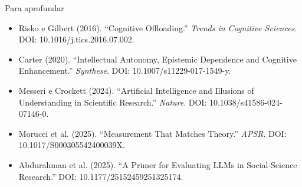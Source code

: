 \documentclass[
  12pt,
  ignorenonframetext,
  aspectratio=169]{beamer}
\begin{document}
\begin{frame}{Para aprofundar}
\protect{}\label{para-aprofundar}
\small

\begin{itemize}
\item Risko e Gilbert (2016). “Cognitive Offloading.” \textit{Trends in Cognitive Sciences}. DOI: 10.1016/j.tics.2016.07.002.
\item Carter (2020). “Intellectual Autonomy, Epistemic Dependence and Cognitive Enhancement.” \textit{Synthese}. DOI: 10.1007/s11229-017-1549-y.
\item Messeri e Crockett (2024). “Artificial Intelligence and Illusions of Understanding in Scientific Research.” \textit{Nature}. DOI: 10.1038/s41586-024-07146-0.
\item Morucci et al. (2025). “Measurement That Matches Theory.” \textit{APSR}. DOI: 10.1017/S000305542400039X.
\item Abdurahman et al. (2025). “A Primer for Evaluating LLMs in Social-Science Research.” DOI: 10.1177/25152459251325174.
\end{itemize}

\vfill
\centering
\end{frame}
\end{document}

